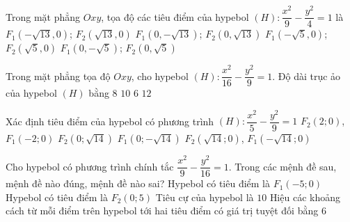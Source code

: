

\begin{ex}%
	Trong mặt phẳng $Oxy$, tọa độ các tiêu điểm của hypebol $(H)\colon\dfrac{x^2}{9}-\dfrac {y^2}{4}=1$ là 
	\choice 
		{\True $F_1(-\sqrt  {13},0)$; $F_2(\sqrt {13},0)$}
		{$F_1(0,-\sqrt {13})$; $F_2(0,\sqrt {13})$} 
		{$F_1(-\sqrt  {5},0)$; $F_2(\sqrt {5},0)$}
		{$F_1(0,-\sqrt {5})$;  $F_2(0,\sqrt {5})$}
\end{ex}

\begin{ex}%
	Trong mặt phẳng tọa độ $Oxy$, cho hypebol $(H)\colon \dfrac{x^2}{16}-\dfrac{y^2}{9}=1$.  Độ dài trục ảo của hypebol $(H)$ bằng
	 \choice
		 {$8$}
		 {$10$}
		 {\True $6$}
		 {$12$}
\end{ex}

\begin{ex}%
	 Xác định tiêu điểm của hypebol có phương trình $ (H)\colon \dfrac{x^2}{5}-\dfrac{y^2}{9}=1 $
	\choice 
		{$ F_2(2;0) $,  $ F_1(-2;0) $}
		 {$ F_2(0;\sqrt{14}) $}
		{$ F_1(0;-\sqrt{14}) $} 
		{\True $ F_2(\sqrt{14};0) $, $ F_1(-\sqrt{14};0) $} 
\end{ex}



\begin{ex}%
	Cho hypebol có phương trình chính tắc $\dfrac{x^2}{9}-\dfrac{y^2}{16}=1$. Trong các mệnh  đề sau, mệnh đề nào đúng, mệnh đề nào sai?
	 \choiceTF
		{\True  Hypebol có tiêu điểm là $F_1(-5;0)$}
		 {Hypebol có tiêu điểm là $F_2(0;5)$}
		{\True Tiêu cự của hypebol là $10$} 
		{\True Hiệu các khoảng cách từ mỗi điểm trên hypebol tới hai tiêu điểm có giá trị tuyệt đối  bằng $6$}
\end{ex}

